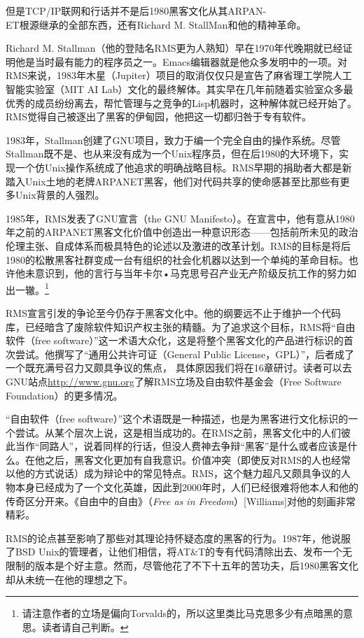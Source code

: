 \documentclass[11pt,oneside]{book}
\begin{document}
\begin{common-format}
但是TCP/IP联网和行话并不是后1980黑客文化从其ARPAN-\\ET根源继承的全部东西，还有Richard M. StallMan和他的精神革命。

Richard M. Stallman（他的登陆名RMS更为人熟知）早在1970年代晚期就已经证明他是当时最有能力的程序员之一。Emacs编辑器就是他众多发明中的一项。对RMS来说，1983年木星（Jupiter）项目的取消仅仅只是宣告了麻省理工学院人工智能实验室（MIT AI Lab）文化的最终解体。其实早在几年前随着实验室众多最优秀的成员纷纷离去，帮忙管理与之竞争的Lisp机器时，这种解体就已经开始了。RMS觉得自己被逐出了黑客的伊甸园，他把这一切都归咎于专有软件。

1983年，Stallman创建了GNU项目，致力于编一个完全自由的操作系统。尽管Stallman既不是、也从来没有成为一个Unix程序员，但在后1980的大环境下，实现一个仿Unix操作系统成了他追求的明确战略目标。RMS早期的捐助者大都是新踏入Unix土地的老牌ARPANET黑客，他们对代码共享的使命感甚至比那些有更多Unix背景的人强烈。

1985年，RMS发表了GNU宣言（the GNU Manifesto）。在宣言中，他有意从1980年之前的ARPANET黑客文化价值中创造出一种意识形态——包括前所未见的政治伦理主张、自成体系而极具特色的论述以及激进的改革计划。RMS的目标是将后1980的松散黑客社群变成一台有组织的社会化机器以达到一个单纯的革命目标。也许他未意识到，他的言行与当年卡尔•马克思号召产业无产阶级反抗工作的努力如出一辙。\footnote{请注意作者的立场是偏向Torvalds的，所以这里类比马克思多少有点暗黑的意思。读者请自己判断。}

RMS宣言引发的争论至今仍存于黑客文化中。他的纲要远不止于维护一个代码库，已经暗含了废除软件知识产权主张的精髓。为了追求这个目标，RMS将“自由软件（free software）”这一术语大众化，这是将整个黑客文化的产品进行标识的首次尝试。他撰写了“通用公共许可证（General Public License，GPL）”，后者成了一个既充满号召力又颇具争议的焦点，  具体原因我们将在16章研讨。读者可以去GNU站点\href{http://www.gnu.org}{http://www.gnu.org}了解RMS立场及自由软件基金会（Free Software Foundation）的更多情况。

“自由软件（free  software）”这个术语既是一种描述，也是为黑客进行文化标识的一个尝试。从某个层次上说，这是相当成功的。在RMS之前，黑客文化中的人们彼此当作“同路人”，说着同样的行话，但没人费神去争辩“黑客”是什么或者应该是什么。在他之后，黑客文化更加有自我意识。价值冲突（即使反对RMS的人也经常以他的方式说话）成为辩论中的常见特点。RMS，这个魅力超凡又颇具争议的人物本身已经成为了一个文化英雄，因此到2000年时，人们已经很难将他本人和他的传奇区分开来。《自由中的自由》（\textit{Free as in Freedom}）[Williams]对他的刻画非常精彩。

RMS的论点甚至影响了那些对其理论持怀疑态度的黑客的行为。1987年，他说服了BSD Unix的管理者，让他们相信，将AT\&{}T的专有代码清除出去、发布一个无限制的版本是个好主意。然而，尽管他花了不下十五年的苦功夫，后1980黑客文化却从未统一在他的理想之下。


\end{common-format}
\end{document}
